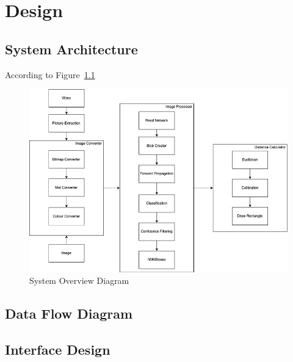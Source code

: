 \chapter{Design}\label{design}

\section{System Architecture}
    According to Figure~\ref{systemOverview}

    \begin{figure}[!ht]
        \includegraphics[width=6in]{images/chapter3/system-overview.png}
        \caption{System Overview Diagram}
        \label{systemOverview}
    \end{figure}

\section{Data Flow Diagram}
\section{Interface Design}